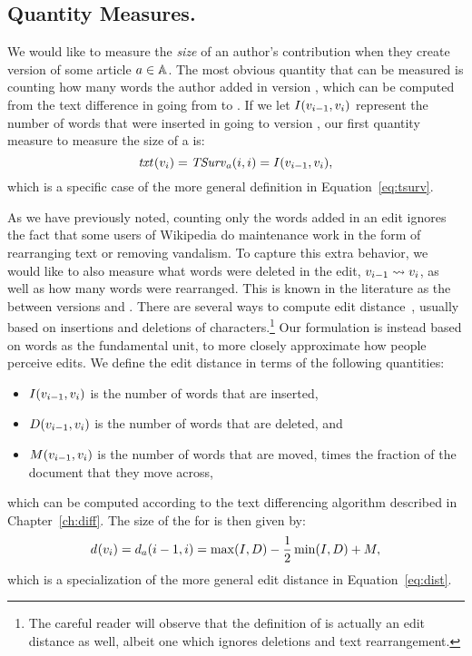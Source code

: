 \subsection{Quantity Measures.}

We would like to measure the \textit{size} of an author's contribution
when they create version  of some article $a \in \mathbb{A}$.
The most obvious quantity that can be measured is counting how
many words the author added in version ,
which can be computed from the text difference in going from
 to .
If we let $I(v_{i-1}, v_{i})$ represent the number
of words that were inserted in going to version ,
our first quantity measure to measure the size of a
 is:
\begin{equation*}
\mathit{txt}_{}(v_{i}) = \mathit{TSurv}_{a}(i,i) = I(v_{i-1},v_{i}),
\end{equation*}
which is a specific case of the more general
definition in Equation~\ref{eq:tsurv}.


As we have previously noted, counting only the words added in
an edit ignores the fact that some users of Wikipedia do maintenance
work in the form of rearranging text or removing vandalism.
To capture this extra behavior, we would like to also measure
what words were deleted in the edit, $v_{i-1} \rightsquigarrow v_{i}$,
as well as how many words were rearranged.
This is known in the literature as the  between
versions  and .
There are several ways to compute edit
distance~\cite{Levenshtein66,TichyEditDist},
usually based on insertions and deletions of
characters.\footnote{The careful reader will observe that
the definition of  is actually an
edit distance as well, albeit one which ignores deletions
and text rearrangement.}
Our formulation is instead based on words as the fundamental unit,
to more closely approximate how people perceive edits.
We define the edit distance in terms of the following quantities:
\begin{itemize}
\item $I(v_{i-1}, v_{i})$ is the number of words that are inserted,
\item $D(v_{i-1}, v_{i})$ is the number of words that are deleted,
    and
\item $M(v_{i-1}, v_{i})$ is the number of words that are moved,
    times the fraction of the document that they move across,
\end{itemize}
which can be computed according to the text differencing
algorithm described in Chapter~\ref{ch:diff}.
The size of the  for  is
then given by:
%
\begin{equation*}
d_{}(v_{i}) = d_{a}(i-1,i) = \max(I, D)
    - \frac{1}{2}\min(I, D) + M,
\end{equation*}
which is a specialization of the more general
edit distance in Equation~\ref{eq:dist}.




